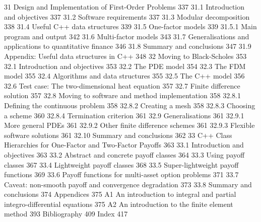 31 Design and Implementation of First-Order Problems 337
31.1 Introduction and objectives 337
31.2 Software requirements 337
31.3 Modular decomposition 338
31.4 Useful C++ data structures 339
31.5 One-factor models 339
31.5.1 Main program and output 342
31.6 Multi-factor models 343
31.7 Generalisations and applications to quantitative finance 346
31.8 Summary and conclusions 347
31.9 Appendix: Useful data structures in C++ 348
32 Moving to Black-Scholes 353
32.1 Introduction and objectives 353
32.2 The PDE model 354
32.3 The FDM model 355
32.4 Algorithms and data structures 355
32.5 The C++ model 356
32.6 Test case: The two-dimensional heat equation 357
32.7 Finite difference solution 357
32.8 Moving to software and method implementation 358
32.8.1 Defining the continuous problem 358
32.8.2 Creating a mesh 358
32.8.3 Choosing a scheme 360
32.8.4 Termination criterion 361
32.9 Generalisations 361
32.9.1 More general PDEs 361
32.9.2 Other finite difference schemes 361
32.9.3 Flexible software solutions 361
32.10 Summary and conclusions 362
33 C++ Class Hierarchies for One-Factor and Two-Factor Payoffs 363
33.1 Introduction and objectives 363
33.2 Abstract and concrete payoff classes 364
33.3 Using payoff classes 367
33.4 Lightweight payoff classes 368
33.5 Super-lightweight payoff functions 369
33.6 Payoff functions for multi-asset option problems 371
33.7 Caveat: non-smooth payoff and convergence degradation 373
33.8 Summary and conclusions 374
Appendices 375
A1 An introduction to integral and partial integro-differential equations 375
A2 An introduction to the finite element method 393
Bibliography 409
Index 417